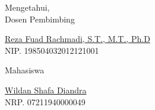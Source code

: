 \vspace{2ex}

\begin{center}

  \begin{multicols}{2}

    Mengetahui, \\
    Dosen Pembimbing
    \vspace{12ex}

    \underline{Reza Fuad Rachmadi, S.T., M.T., Ph.D} \\
    NIP. 198504032012121001

    \columnbreak

    \hfill \break
    Mahasiswa
    \vspace{12ex}

    \underline{Wildan Shafa Diandra} \\
    NRP. 07211940000049

  \end{multicols}

\end{center}